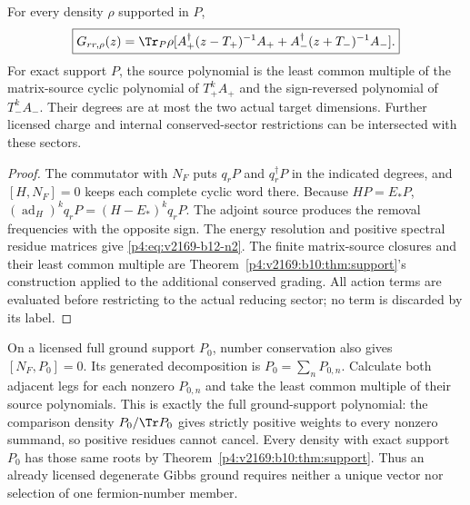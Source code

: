 \documentclass[12pt,a4paper]{article}
\begin{document}
\begin{theorem}
\label{p4:v2169:b12:thm:adjacentnumber}
For every density $\rho$ supported in $P$,
\begin{equation}
 \boxed{G_{rr,\rho}(z)=\Tr_P\rho[
   A_+^\dagger(z-T_+)^{-1}A_+
  +A_-^\dagger(z+T_-)^{-1}A_-].}
 \label{p4:eq:v2169-b12-n2}
\end{equation}
For exact support $P$, the source polynomial is the least common multiple
of the matrix-source cyclic polynomial of $T_+^kA_+$ and the sign-reversed
polynomial of $T_-^kA_-$. Their degrees are at most the two actual target
dimensions. Further licensed charge and internal conserved-sector restrictions
can be intersected with these sectors.
\end{theorem}
\begin{proof}
The commutator with $N_F$ puts $q_rP$ and $q_r^\dagger P$ in the indicated
degrees, and $[H,N_F]=0$ keeps each complete cyclic word there.
Because $HP=E_*P$,
$(\operatorname{ad}_H)^kq_rP=(H-E_*)^kq_rP$.
The adjoint source produces the removal frequencies with the opposite sign.
The energy resolution and positive spectral residue matrices give \eqref{p4:eq:v2169-b12-n2}.
The finite matrix-source closures and their least common multiple are
Theorem~\ref{p4:v2169:b10:thm:support}'s construction applied to the additional conserved grading.
All action terms are evaluated before restricting to the actual reducing
sector; no term is discarded by its label.
\end{proof}

On a licensed full ground support $P_0$, number conservation also gives
$[N_F,P_0]=0$. Its generated decomposition is $P_0=\sum_nP_{0,n}$.
Calculate both adjacent legs for each nonzero $P_{0,n}$ and take the least
common multiple of their source polynomials. This is exactly the full
ground-support polynomial: the comparison density $P_0/\Tr P_0$ gives
strictly positive weights to every nonzero summand, so positive residues
cannot cancel. Every density with exact support $P_0$ has those same roots
by Theorem~\ref{p4:v2169:b10:thm:support}. Thus an already licensed degenerate Gibbs ground requires
neither a unique vector nor selection of one fermion-number member.
\end{document}
